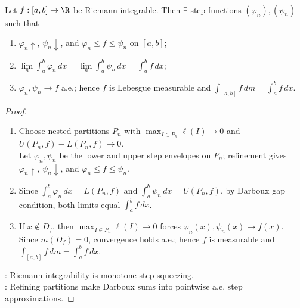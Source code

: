 \begin{corollary} \label{cor:riemann-integrable-monotone-step-approximation} \\
Let $f:[a,b]\to\R$ be Riemann integrable. Then $\exists$ step functions $(\varphi_n),(\psi_n)$ such that
\begin{enumerate}[label=(\roman*)]
\setlength{\itemsep}{0pt}
\item $\varphi_n\uparrow$, $\psi_n\downarrow$, and $\varphi_n\leq f\leq\psi_n$ on $[a,b]$;
\item $\lim\limits_n\int_a^b\varphi_n\,dx=\lim\limits_n\int_a^b\psi_n\,dx=\int_a^bf\,dx$;
\item $\varphi_n,\psi_n\to f$ a.e.; hence $f$ is Lebesgue measurable and $\int_{[a,b]}f\,dm=\int_a^bf\,dx$.
\end{enumerate}
\begin{proof}
\begin{enumerate}[label=(\roman*)]
\setlength{\itemsep}{0pt}
\item Choose nested partitions $P_n$ with $\max_{I\in P_n}\ell(I)\to0$ and $U(P_n,f)-L(P_n,f)\to0$.\\
Let $\varphi_n,\psi_n$ be the lower and upper step envelopes on $P_n$; refinement gives $\varphi_n\uparrow$, $\psi_n\downarrow$, and $\varphi_n\leq f\leq\psi_n$.
\item Since $\int_a^b\varphi_n\,dx=L(P_n,f)$ and $\int_a^b\psi_n\,dx=U(P_n,f)$, by Darboux gap condition, both limits equal $\int_a^bf\,dx$.
\item If $x\notin D_f$, then $\max_{I\in P_n}\ell(I)\to0$ forces $\varphi_n(x),\psi_n(x)\to f(x)$.\\
Since $m(D_f)=0$, convergence holds a.e.; hence $f$ is measurable and $\int_{[a,b]}f\,dm=\int_a^bf\,dx$.
\end{enumerate}
: Riemann integrability is monotone step squeezing.\\
: Refining partitions make Darboux sums into pointwise a.e. step approximations.
\end{proof}
\end{corollary}


